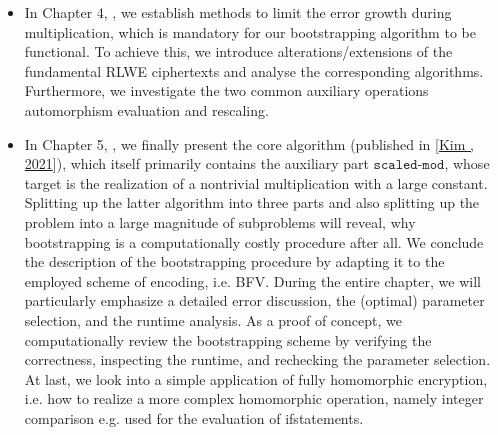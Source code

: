 \documentclass[letterpaper,10pt,english]{jupyterBook}
\begin{document}
\begin{itemize}
\item {} 
\sphinxAtStartPar
In Chapter 4, {\hyperref[\detokenize{Thesis:preparations-for-bootstrapping}]{}}, we establish methods to limit the error growth during multiplication, which is mandatory for our bootstrapping algorithm to be functional.
To achieve this, we introduce alterations/extensions of the fundamental RLWE ciphertexts and analyse the corresponding algorithms.
Furthermore, we investigate the two common auxiliary operations automorphism evaluation and rescaling.

\item {} 
\sphinxAtStartPar
In Chapter 5, {\hyperref[\detokenize{Thesis:bootstrapping}]{}}, we finally present the core algorithm (published in {[}\hyperlink{cite.Thesis:id72}{Kim , 2021}{]}), which itself primarily contains the auxiliary part \(\texttt{scaled-mod}\), whose target is the realization of a non\sphinxhyphen{}trivial multiplication with a large constant.
Splitting up the latter algorithm into three parts and also splitting up the problem into a large magnitude of subproblems will reveal, why bootstrapping is a computationally costly procedure after all.
We conclude the description of the bootstrapping procedure by adapting it to the employed scheme of encoding, i.e. BFV.
During the entire chapter, we will particularly emphasize a detailed error discussion, the (optimal) parameter selection, and the runtime analysis.
As a proof of concept, we computationally review the bootstrapping scheme by verifying the correctness, inspecting the runtime, and rechecking the parameter selection.
At last, we look into a simple application of fully homomorphic encryption, i.e. how to realize a more complex homomorphic operation, namely integer comparison e.g. used for the evaluation of if\sphinxhyphen{}statements.

\end{itemize}
\end{document}
